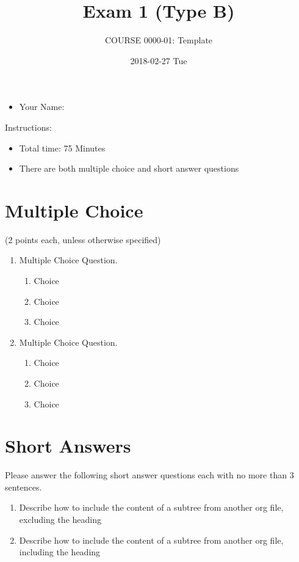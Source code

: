 \documentclass[article,letterpaper,times,10pt,listings-bw,microtype]{article}
\author{COURSE 0000-01: Template}
\date{2018-02-27 Tue}
\title{Exam 1 (Type B)}
\begin{document}
\maketitle
\vspace{20 mm}

\begin{itemize}
\item Your Name: \underline{\hspace{4cm}}
\end{itemize}

\vspace{20 mm}

Instructions:

\begin{itemize}
\item Total time: 75 Minutes
\item There are both multiple choice and short answer questions
\end{itemize}
\clearpage
\section*{Multiple Choice}
\label{sec:orga097312}
(2 points each, unless otherwise specified)
\begin{enumerate}
\item Multiple Choice Question.
\begin{enumerate}
\item Choice
\item Choice
\item Choice
\end{enumerate}

\item Multiple Choice Question.
\begin{enumerate}
\item Choice
\item Choice
\item Choice
\end{enumerate}
\end{enumerate}
\clearpage
\section*{Short Answers}
\label{sec:org31c256f}
\begin{mdframed}[style=exampledefault, frametitle={}]
Please answer the following short answer questions each with no more than 3
sentences.
\end{mdframed}

\begin{enumerate}
\item Describe how to include the content of a subtree from another org file, excluding the heading

\vspace{50 mm}

\item Describe how to include the content of a subtree from another org file, including the heading
\end{enumerate}
\end{document}
